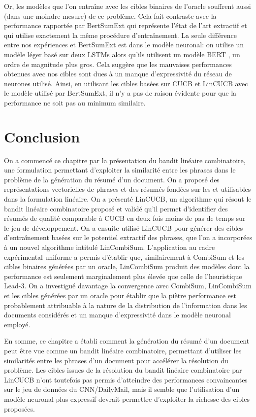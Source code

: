 Or, les modèles que l'on entraîne avec les cibles binaires de l'oracle souffrent aussi
(dans une moindre mesure) de ce problème.
Cela fait contraste avec la performance rapportée par BertSumExt \citep{liu2019text}
qui représente l'état de l'art extractif et qui utilise exactement la même procédure 
d'entraînement.
La seule différence entre nos expériences et BertSumExt est dans le modèle neuronal:
on utilise un modèle léger basé sur deux LSTMs \citep{10.1162/neco.1997.9.8.1735} 
alors qu'ils utilisent un modèle BERT \citep{devlin-etal-2019-bert}, 
un ordre de magnitude plus gros.
Cela suggère que les mauvaises performances obtenues 
avec nos cibles sont dues à un manque d'expressivité du réseau de neurones utilisé.
Ainsi, en utilisant les cibles basées sur CUCB et LinCUCB avec le modèle utilisé par BertSumExt, 
il n'y a pas de raison évidente pour que la performance ne soit pas au minimum similaire.

\section{Conclusion}

On a commencé ce chapitre par la présentation du bandit linéaire combinatoire,
une formulation permettant d'exploiter la similarité entre les phrases 
dans le problème de la génération du résumé d'un document.
On a proposé des représentations vectorielles de phrases 
et des résumés fondées sur les \ngrams et utilisables dans la formulation linéaire.
On a présenté LinCUCB, un algorithme qui résout le bandit linéaire combinatoire
proposé et validé qu'il permet d'identifier des résumés de qualité comparable 
à CUCB en deux fois moins de pas de temps sur le jeu de développement.
On a ensuite utilisé LinCUCB pour générer des cibles d'entraînement basées 
sur le potentiel extractif des phrases, que l'on a incorporées
à un nouvel algorithme intitulé LinCombiSum.
L'application au cadre expérimental uniforme a permis d'établir que,
similairement à CombiSum et les cibles binaires générées par un oracle,
LinCombiSum produit des modèles dont la performance est seulement marginalement 
plus élevée que celle de l'heuristique Lead-3.
On a investigué davantage la convergence avec CombiSum, LinCombiSum et
les cibles générées par un oracle pour établir que la piètre performance 
est probablement attribuable à la nature de la distribution 
de l'information dans les documents considérés et un manque d'expressivité
dans le modèle neuronal employé.

En somme, ce chapitre a établi comment la génération du résumé 
d'un document peut être vue comme un bandit linéaire combinatoire, 
permettant d'utiliser les similarités entre les phrases d'un document pour
accélérer la résolution du problème.
Les cibles issues de la résolution du bandit linéaire combinatoire par LinCUCB 
n'ont toutefois pas permis d'atteindre des performances convaincantes sur le 
jeu de données du CNN/DailyMail, mais il semble que l'utilisation d'un modèle neuronal 
plus expressif devrait permettre d'exploiter la richesse des cibles proposées.